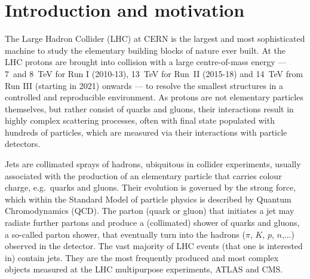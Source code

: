 %
\chapter{Introduction and motivation}\label{chap:introduction}

The Large Hadron Collider (LHC) at CERN is the largest and most
sophisticated machine to study the elementary building blocks of
nature ever built.
%
At the LHC protons are brought into collision with a large
centre-of-mass energy --- 7~and 8~TeV for Run I (2010-13), 13~TeV for
Run~II (2015-18) and 14~TeV from Run III (starting in 2021) onwards
--- to resolve the smallest structures in a controlled and
reproducible environment. As protons are not elementary particles
themselves, but rather consist of quarks and gluons, their
interactions result in highly complex scattering processes, often with
final state populated with hundreds of particles, which are measured
via their interactions with particle detectors.

Jets are collimated sprays of hadrons, ubiquitous in collider
experiments, usually associated with the production of an elementary
particle that carries colour charge, e.g.\ quarks and gluons. Their
evolution is governed by the strong force, which within the Standard
Model of particle physics is described by Quantum Chromodynamics
(QCD).  The parton (\ie quark or gluon) that initiates a jet may
radiate further partons and produce a (collimated) shower of quarks
and gluons, a so-called parton shower, that eventually turn into the
hadrons ($\pi$, $K$, $p$, $n$,...) observed in the detector.  The vast
majority of LHC events (that one is interested in) contain jets. They
are the most frequently produced and most complex objects measured at
the LHC multipurpose experiments, ATLAS and CMS.

